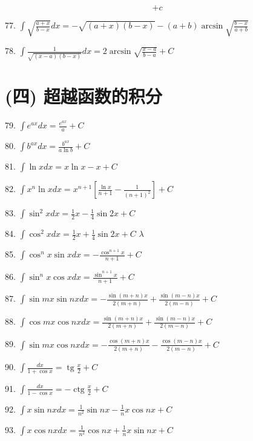 \documentclass[10pt]{article}
\begin{document}
\[
+ c
\]

77. \(\int \sqrt{\frac{a + x}{b - x}}{dx} = - \sqrt{\left( {a + x}\right) \left( {b - x}\right) } - \left( {a + b}\right) \arcsin \sqrt{\frac{b - x}{a + b}}\)

78. \(\int \frac{1}{\sqrt{\left( {x - a}\right) \left( {b - x}\right) }}{dx} = 2\arcsin \sqrt{\frac{x - a}{b - a}} + C\)

\section*{(四) 超越函数的积分}

79. \(\int {e}^{ax}{dx} = \frac{{e}^{ax}}{a} + C\)

80. \(\int {b}^{ax}{dx} = \frac{{b}^{ax}}{a\ln b} + C\)

81. \(\int \ln {xdx} = x\ln x - x + C\)

82. \(\int {x}^{n}\ln {xdx} = {x}^{n + 1}\left\lbrack {\frac{\ln x}{n + 1} - \frac{1}{{\left( n + 1\right) }^{2}}}\right\rbrack + C\)

83. \(\int {\sin }^{2}{xdx} = \frac{1}{2}x - \frac{1}{4}\sin {2x} + C\)

84. \(\int {\cos }^{2}{xdx} = \frac{1}{2}x + \frac{1}{4}\sin {2x} + C\) \(\lambda\)

85. \(\int {\cos }^{n}x\sin {xdx} = - \frac{{\cos }^{n + 1}x}{n + 1} + C\)

86. \(\int {\sin }^{n}x\cos {xdx} = \frac{{\sin }^{n + 1}x}{n + 1} + C\)

87. \(\int \sin {mx}\sin {nxdx} = - \frac{\sin \left( {m + n}\right) x}{2\left( {m + n}\right) } + \frac{\sin \left( {m - n}\right) x}{2\left( {m - n}\right) } + C\)

88. \(\int \cos {mx}\cos {nxdx} = \frac{\sin \left( {m + n}\right) x}{2\left( {m + n}\right) } + \frac{\sin \left( {m - n}\right) x}{2\left( {m - n}\right) } + C\)

89. \(\int \sin {mx}\cos {nxdx} = - \frac{\cos \left( {m + n}\right) x}{2\left( {m + n}\right) } - \frac{\cos \left( {m - n}\right) x}{2\left( {m - n}\right) } + C\)

90. \(\int \frac{dx}{1 + \cos x} = \operatorname{tg}\frac{x}{2} + C\)

91. \(\int \frac{dx}{1 - \cos x} = - \operatorname{ctg}\frac{x}{2} + C\)

92. \(\int x\sin {nxdx} = \frac{1}{{n}^{2}}\sin {nx} - \frac{1}{n}x\cos {nx} + C\)

93. \(\int x\cos {nxdx} = \frac{1}{{n}^{2}}\cos {nx} + \frac{1}{n}x\sin {nx} + C\)
\end{document}

